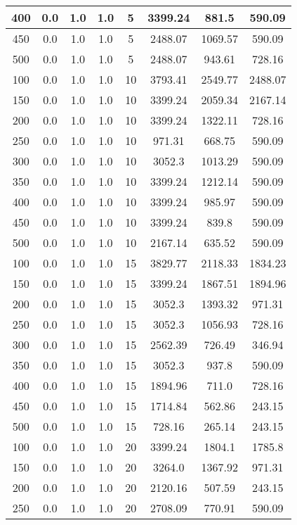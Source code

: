\documentclass[a4paper, 12pt]{extreport}
\begin{document}
\begin{itemize}
\begin{longtable}{|c|c|c|c|c|c|c|c|}
			400 & 0.0 & 1.0 & 1.0 & 5 & 3399.24 & 881.5 & 590.09 \\\hline
			450 & 0.0 & 1.0 & 1.0 & 5 & 2488.07 & 1069.57 & 590.09 \\\hline
			500 & 0.0 & 1.0 & 1.0 & 5 & 2488.07 & 943.61 & 728.16 \\\hline
			100 & 0.0 & 1.0 & 1.0 & 10 & 3793.41 & 2549.77 & 2488.07 \\\hline
			150 & 0.0 & 1.0 & 1.0 & 10 & 3399.24 & 2059.34 & 2167.14 \\\hline
			200 & 0.0 & 1.0 & 1.0 & 10 & 3399.24 & 1322.11 & 728.16 \\\hline
			250 & 0.0 & 1.0 & 1.0 & 10 & 971.31 & 668.75 & 590.09 \\\hline
			300 & 0.0 & 1.0 & 1.0 & 10 & 3052.3 & 1013.29 & 590.09 \\\hline
			350 & 0.0 & 1.0 & 1.0 & 10 & 3399.24 & 1212.14 & 590.09 \\\hline
			400 & 0.0 & 1.0 & 1.0 & 10 & 3399.24 & 985.97 & 590.09 \\\hline
			450 & 0.0 & 1.0 & 1.0 & 10 & 3399.24 & 839.8 & 590.09 \\\hline
			500 & 0.0 & 1.0 & 1.0 & 10 & 2167.14 & 635.52 & 590.09 \\\hline
			100 & 0.0 & 1.0 & 1.0 & 15 & 3829.77 & 2118.33 & 1834.23 \\\hline
			150 & 0.0 & 1.0 & 1.0 & 15 & 3399.24 & 1867.51 & 1894.96 \\\hline
			200 & 0.0 & 1.0 & 1.0 & 15 & 3052.3 & 1393.32 & 971.31 \\\hline
			250 & 0.0 & 1.0 & 1.0 & 15 & 3052.3 & 1056.93 & 728.16 \\\hline
			300 & 0.0 & 1.0 & 1.0 & 15 & 2562.39 & 726.49 & 346.94 \\\hline
			350 & 0.0 & 1.0 & 1.0 & 15 & 3052.3 & 937.8 & 590.09 \\\hline
			400 & 0.0 & 1.0 & 1.0 & 15 & 1894.96 & 711.0 & 728.16 \\\hline
			450 & 0.0 & 1.0 & 1.0 & 15 & 1714.84 & 562.86 & 243.15 \\\hline
			500 & 0.0 & 1.0 & 1.0 & 15 & 728.16 & 265.14 & 243.15 \\\hline
			100 & 0.0 & 1.0 & 1.0 & 20 & 3399.24 & 1804.1 & 1785.8 \\\hline
			150 & 0.0 & 1.0 & 1.0 & 20 & 3264.0 & 1367.92 & 971.31 \\\hline
			200 & 0.0 & 1.0 & 1.0 & 20 & 2120.16 & 507.59 & 243.15 \\\hline
			250 & 0.0 & 1.0 & 1.0 & 20 & 2708.09 & 770.91 & 590.09 \\\hline

\end{longtable}
\end{itemize}
\end{document}
